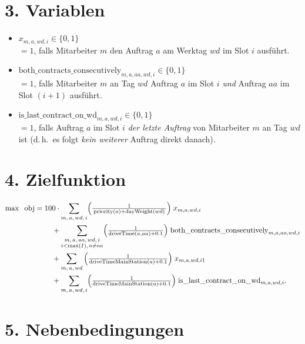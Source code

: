 \documentclass[12pt,a4paper]{article}
\begin{document}
\section*{3. Variablen}
\begin{itemize}
  \item $x_{m,a,wd,i} \in \{0,1\}$ 
  \\[3pt]
    $=1$, falls Mitarbeiter $m$ den Auftrag $a$ am Werktag $wd$ im Slot $i$ ausführt.
  \item $\text{both\_contracts\_consecutively}_{m,a,aa,wd,i} \in \{0,1\}$
  \\[3pt]
    $=1$, falls Mitarbeiter $m$ an Tag $wd$ Auftrag $a$ im Slot $i$ \emph{und} Auftrag $aa$ im Slot $(i+1)$ ausführt.
  \item $\text{is\_last\_contract\_on\_wd}_{m,a,wd,i} \in \{0,1\}$
  \\[3pt]
    $=1$, falls Auftrag $a$ im Slot $i$ \emph{der letzte Auftrag} von Mitarbeiter $m$ an Tag $wd$ ist (d.\,h.\ es folgt \emph{kein weiterer} Auftrag direkt danach).
\end{itemize}

\section*{4. Zielfunktion}

\begin{align*}
\max \;\;\text{obj} 
=\;&
  100 \cdot \sum_{m,\,a,\,wd,\,i}
    \Bigl(
      \tfrac{1}{\,\text{priority}(a)+\text{dayWeight}(wd)\,}
    \Bigr)
    \; x_{m,a,wd,i}
\\
&\quad
  + \sum_{\substack{m,\,a,\,aa,\,wd,\,i \\ i < \max(I),\,a\neq aa}}
    \Bigl(\tfrac{1}{\text{driveTime}(a,aa)+0.1}\Bigr)\;
    \text{both\_contracts\_consecutively}_{m,a,aa,wd,i}
\\
&\quad
  + \sum_{m,\,a,\,wd}\,
    \Bigl(\tfrac{1}{\text{driveTimeMainStation}(a)+0.1}\Bigr)\;
    x_{m,a,wd,i1}
\\
&\quad
  + \sum_{m,\,a,\,wd,\,i}
    \Bigl(\tfrac{1}{\text{driveTimeMainStation}(a)+0.1}\Bigr)\;
    \text{is\_last\_contract\_on\_wd}_{m,a,wd,i}.
\end{align*}

\section*{5. Nebenbedingungen}
\end{document}
